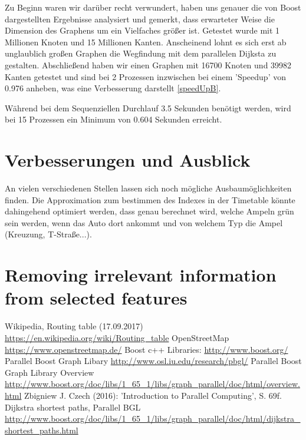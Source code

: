 \documentclass[paper=A4,pagesize=auto,12pt,headinclude=true,footinclude=true,BCOR=0mm,DIV=calc]{scrartcl}
\begin{document}
	Zu Beginn waren wir darüber recht verwundert, haben uns genauer die von Boost dargestellten Ergebnisse analysiert und gemerkt, dass erwarteter Weise die Dimension des Graphens um ein Vielfaches größer ist. Getestet wurde mit 1 Millionen Knoten und 15 Millionen Kanten\cite{DijkstraBoost}. Anscheinend lohnt es sich erst ab unglaublich großen Graphen die Wegfindung mit dem parallelen Dijksta zu gestalten. Abschließend haben wir einen Graphen mit 16700 Knoten und 39982 Kanten getestet und sind bei 2 Prozessen inzwischen bei einem 'Speedup' von 0.976 anheben, was eine Verbesserung darstellt \ref{speedUpB}.


	
	
	
	
	
	
	Während bei dem Sequenziellen Durchlauf 3.5 Sekunden benötigt werden, wird bei 15 Prozessen ein Minimum von 0.604 Sekunden erreicht.
	\section{Verbesserungen und Ausblick}
	An vielen verschiedenen Stellen lassen sich noch mögliche Ausbaumöglichkeiten finden. Die Approximation zum bestimmen des Indexes in der Timetable könnte dahingehend optimiert werden, dass genau berechnet wird, welche Ampeln grün sein werden, wenn das Auto dort ankommt und von welchem Typ die Ampel (Kreuzung, T-Straße...). 
	
	\section{Removing irrelevant information from selected features}
	
	
	
	\newpage
	
	\begin{thebibliography}{xxxxxx}
		Wikipedia, Routing table  (17.09.2017) \url{https://en.wikipedia.org/wiki/Routing_table}
		 OpenStreetMap \url{https://www.openstreetmap.de/}
		 Boost c++ Libraries: \url{http://www.boost.org/}
		 Parallel Boost Graph Libary \url{http://www.osl.iu.edu/research/pbgl/}
		 Parallel Boost Graph Library Overview \url{http://www.boost.org/doc/libs/1_65_1/libs/graph_parallel/doc/html/overview.html}
		 Zbigniew J. Czech (2016): 'Introduction to Parallel Computing', S. 69f.
		 Dijkstra shortest paths, Parallel BGL \url{http://www.boost.org/doc/libs/1_65_1/libs/graph_parallel/doc/html/dijkstra_shortest_paths.html}
	\end{thebibliography}
	

	
	
\end{document}
